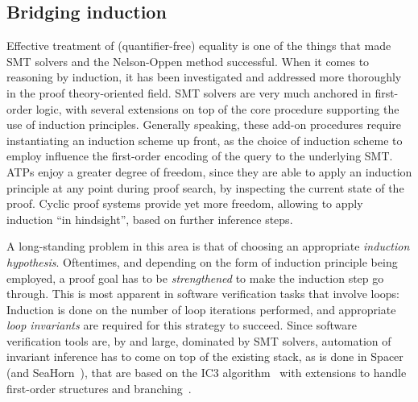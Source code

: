 \subsection{Bridging induction}
\label{plan-induction}

Effective treatment of (quantifier-free) equality is one of the things that made SMT solvers and the Nelson-Oppen method successful.
When it comes to reasoning by induction, it has been investigated and addressed more thoroughly in the proof theory-oriented field.
SMT solvers are very much anchored in first-order logic, with several extensions on top of the core procedure supporting the use of induction principles.
Generally speaking, these add-on procedures require instantiating an induction scheme up front, as the choice of induction scheme to employ influence the first-order encoding of the query to the underlying SMT.
ATPs enjoy a greater degree of freedom, since they are able to apply an induction principle at any point during proof search, by inspecting the current state of the proof.
Cyclic proof systems provide yet more freedom, allowing to apply induction ``in hindsight'', based on further inference steps.

A long-standing problem in this area is that of choosing an appropriate \emph{induction hypothesis}.
Oftentimes, and depending on the form of induction principle being employed, a proof goal has to be \emph{strengthened} to make the induction step go through.
This is most apparent in software verification tasks that involve loops:
Induction is done on the number of loop iterations performed, and appropriate \emph{loop invariants} are required for this strategy to succeed.
Since software verification tools are, by and large, dominated by SMT solvers, automation of invariant inference has to come on top of the existing stack, as is done in Spacer~\cite{CAV2013:Komuravelli} (and SeaHorn~\cite{TACAS2015:Gurfinkel}),
that are based on the IC3 algorithm~\cite{VMCAI2006:Bradley} with extensions to handle first-order structures and branching~\cite{CAV2014:Komuravelli}.

